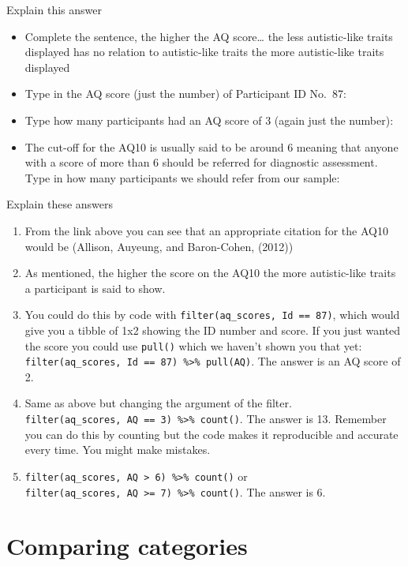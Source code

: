 \documentclass[]{book}
\begin{document}
Explain this answer

\begin{itemize}
\item
  Complete the sentence, the higher the AQ score\ldots{} the less autistic-like traits displayed has no relation to autistic-like traits the more autistic-like traits displayed
\item
  Type in the AQ score (just the number) of Participant ID No.~87: 
\item
  Type how many participants had an AQ score of 3 (again just the number): 
\item
  The cut-off for the AQ10 is usually said to be around 6 meaning that anyone with a score of more than 6 should be referred for diagnostic assessment. Type in how many participants we should refer from our sample: 
\end{itemize}

Explain these answers

\begin{enumerate}
\def\labelenumi{\arabic{enumi}.}
\item
  From the link above you can see that an appropriate citation for the AQ10 would be (Allison, Auyeung, and Baron-Cohen, (2012))
\item
  As mentioned, the higher the score on the AQ10 the more autistic-like traits a participant is said to show.
\item
  You could do this by code with \texttt{filter(aq\_scores,\ Id\ ==\ 87)}, which would give you a tibble of 1x2 showing the ID number and score. If you just wanted the score you could use \texttt{pull()} which we haven't shown you that yet: \texttt{filter(aq\_scores,\ Id\ ==\ 87)\ \%\textgreater{}\%\ pull(AQ)}. The answer is an AQ score of 2.
\item
  Same as above but changing the argument of the filter. \texttt{filter(aq\_scores,\ AQ\ ==\ 3)\ \%\textgreater{}\%\ count()}. The answer is 13. Remember you can do this by counting but the code makes it reproducible and accurate every time. You might make mistakes.
\item
  \texttt{filter(aq\_scores,\ AQ\ \textgreater{}\ 6)\ \%\textgreater{}\%\ count()} or \texttt{filter(aq\_scores,\ AQ\ \textgreater{}=\ 7)\ \%\textgreater{}\%\ count()}. The answer is 6.
\end{enumerate}

\hypertarget{comparing-categories}{%
\chapter{Comparing categories}\label{comparing-categories}}
\end{document}
